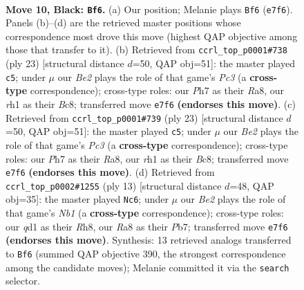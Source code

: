 \documentclass[11pt]{article}
\begin{document}
\clearpage

\begin{figure}[p]\centering
\begin{subfigure}{0.46\textwidth}\centering
\resizebox{\linewidth}{!}{%
\newchessgame
\chessboard[
  setfen={rnbqk2r/pp2bppp/2p5/3p4/P2P1PP1/2N1P3/1P5P/R2QKBNR b KQkq - 0 10},
  showmover=false,
  pgfstyle=straightmove, color=movearrow, markmove={e7-f6}
]}
\caption{}
\end{subfigure}\hfill
\begin{subfigure}{0.46\textwidth}\centering
\resizebox{\linewidth}{!}{%
\newchessgame
\chessboard[
  setfen={r1bqkb1r/p4pp1/2pp1n1p/8/1p2PB2/1P1P1N2/1PP1N1PP/R2Q1R1K b kq - 1 12},
  showmover=false,
  pgfstyle=straightmove, color=movearrow, markmove={c6-c5}
]}
\caption{}
\end{subfigure}
\\[4pt]
\begin{subfigure}{0.46\textwidth}\centering
\resizebox{\linewidth}{!}{%
\newchessgame
\chessboard[
  setfen={r1bqkb1r/p4pp1/2pp1n1p/8/1p2PB2/1P1P1N2/1PP1N1PP/R2Q1R1K b kq - 0 12},
  showmover=false,
  pgfstyle=straightmove, color=movearrow, markmove={c6-c5}
]}
\caption{}
\end{subfigure}\hfill
\begin{subfigure}{0.46\textwidth}\centering
\resizebox{\linewidth}{!}{%
\newchessgame
\chessboard[
  setfen={rn1qkb1r/ppp4p/4bpp1/3p1p2/3P3P/2NBP3/PPP2PP1/R2QK1NR b KQkq - 2 7},
  showmover=false,
  pgfstyle=straightmove, color=movearrow, markmove={b8-c6}
]}
\caption{}
\end{subfigure}
\caption{\textbf{Move 10, Black: \texttt{Bf6}.} (a) Our position; Melanie plays \texttt{Bf6} (\texttt{e7f6}). Panels (b)--(d) are the retrieved master positions whose correspondence most drove this move (highest QAP objective among those that transfer to it). (b) Retrieved from \texttt{ccrl\_top\_p0001\#738} (ply 23) [structural distance $d$=50, QAP obj=51]: the master played \texttt{c5}; under $\mu$ our \emph{Be2} plays the role of that game's \emph{Pc3} (a \textbf{cross-type} correspondence); cross-type roles: our \emph{P}h7 as their \emph{R}a8, our \emph{r}h1 as their \emph{B}c8; transferred move \texttt{e7f6} \textbf{(endorses this move)}. (c) Retrieved from \texttt{ccrl\_top\_p0001\#739} (ply 23) [structural distance $d$=50, QAP obj=51]: the master played \texttt{c5}; under $\mu$ our \emph{Be2} plays the role of that game's \emph{Pc3} (a \textbf{cross-type} correspondence); cross-type roles: our \emph{P}h7 as their \emph{R}a8, our \emph{r}h1 as their \emph{B}c8; transferred move \texttt{e7f6} \textbf{(endorses this move)}. (d) Retrieved from \texttt{ccrl\_top\_p0002\#1255} (ply 13) [structural distance $d$=48, QAP obj=35]: the master played \texttt{Nc6}; under $\mu$ our \emph{Be2} plays the role of that game's \emph{Nb1} (a \textbf{cross-type} correspondence); cross-type roles: our \emph{q}d1 as their \emph{R}h8, our \emph{R}a8 as their \emph{P}b7; transferred move \texttt{e7f6} \textbf{(endorses this move)}. Synthesis: 13 retrieved analogs transferred to \texttt{Bf6} (summed QAP objective 390, the strongest correspondence among the candidate moves); Melanie committed it via the \texttt{search} selector.}

\end{figure}
\end{document}
